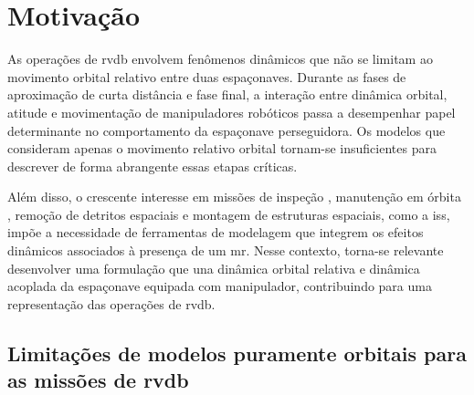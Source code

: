 \section{Motivação}

As operações de \gls{rvdb} envolvem fenômenos dinâmicos que não se limitam ao movimento orbital relativo entre duas espaçonaves.
Durante as fases de aproximação de curta distância e fase final, a interação entre dinâmica orbital, atitude e movimentação de manipuladores robóticos passa a desempenhar papel determinante no comportamento da espaçonave perseguidora.
Os modelos que consideram apenas o movimento relativo orbital tornam-se insuficientes para descrever de forma abrangente essas etapas críticas.

Além disso, o crescente interesse em missões de inspeção \cite{dennehy_2016_rcs}, manutenção em órbita \cite{mev_northrop}, remoção de detritos espaciais \cite{jaxa_deb_rendezvous} e montagem de estruturas espaciais, como a \gls{iss}, impõe a necessidade de ferramentas de modelagem que integrem os efeitos dinâmicos associados à presença de um \gls{mr}.
Nesse contexto, torna-se relevante desenvolver uma formulação que una dinâmica orbital relativa e dinâmica acoplada da espaçonave equipada com manipulador, contribuindo para uma representação das operações de \gls{rvdb}.

\subsection{Limitações de modelos puramente orbitais para as missões de \gls{rvdb}}




